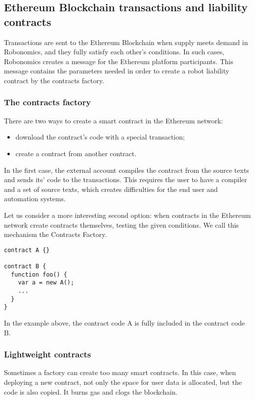 \documentclass{article}
\begin{document}
\subsection{Ethereum Blockchain transactions and liability contracts}

Transactions are sent to the Ethereum Blockchain when supply meets demand in Robonomics, and they fully satisfy each other's conditions. In such cases, Robonomics creates a message for the Ethereum platform participants. This message contains the parameters needed in order to create a robot liability contract by the contracts factory.

\subsubsection{The contracts factory}

There are two ways to create a smart contract in the Ethereum network:
\begin{itemize}[noitemsep]
	\item download the contract's code with a special transaction;
	\item create a contract from another contract.
\end{itemize}

In the first case, the external account compiles the contract from the source texts and sends its' code to the transactions. This requires the user to have a compiler and a set of source texts, which creates difficulties for the end user and automation systems.

Let us consider a more interesting second option: when contracts in the Ethereum network create contracts themselves, testing the given conditions. We call this mechanism the Contracts Factory.

\begin{lstlisting}
contract A {}

contract B {
  function foo() {
    var a = new A();
    ...
  }
}
\end{lstlisting}

In the example above, the contract code A is fully included in the contract code B.

\subsubsection{Lightweight contracts}

Sometimes a factory can create too many smart contracts. In this case, when deploying a new contract, not only the space for user data is allocated, but the code is also copied. It burns gas and clogs the blockchain.
\end{document}
